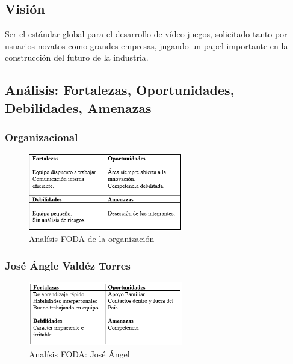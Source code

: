 \documentclass[]{article}
\begin{document}
\subsection{Visi\'on} 
Ser el est\'andar global para el desarrollo de v\'ideo juegos, solicitado tanto por usuarios novatos como grandes empresas, jugando un papel importante en la construcci\'on del futuro de la industria. 


\subsection{An\'alisis: Fortalezas, Oportunidades, Debilidades, Amenazas}

\subsubsection{Organizacional}
\begin{figure}[H]
	
	\centering
	\includegraphics[width=0.6\textwidth]{org}
	\caption{Anal\'isis FODA de la organizaci\'on}
	
\end{figure}


\subsubsection{Jos\'e \'Angle Vald\'ez Torres }
\begin{figure}[H]
	
	\centering
	\includegraphics[width=0.6\textwidth]{jose}
	\caption{Anal\'isis FODA: Jos\'e \'Angel}
	
\end{figure}
\end{document}
